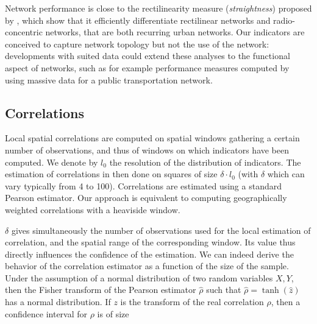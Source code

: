 \documentclass[11pt]{article}
\begin{document}
Network performance is close to the rectilinearity measure (\emph{straightness}) proposed by \cite{josselin2016straightness}, which show that it efficiently differentiate rectilinear networks and radio-concentric networks, that are both recurring urban networks. Our indicators are conceived to capture network topology but not the use of the network: developments with suited data could extend these analyses to the functional aspect of networks, such as for example performance measures computed by~\cite{trepanier2009calculation} using massive data for a public transportation network.



\subsection{Correlations}

Local spatial correlations are computed on spatial windows gathering a certain number of observations, and thus of windows on which indicators have been computed. We denote by $l_0$ the resolution of the distribution of indicators. The estimation of correlations in then done on squares of size $\delta\cdot l_0$ (with $\delta$ which can vary typically from 4 to 100). Correlations are estimated using a standard Pearson estimator. Our approach is equivalent to computing geographically weighted correlations \citep{brunsdon2002geographically} with a heaviside window.

$\delta$ gives simultaneously the number of observations used for the local estimation of correlation, and the spatial range of the corresponding window. Its value thus directly influences the confidence of the estimation. We can indeed derive the behavior of the correlation estimator as a function of the size of the sample. Under the assumption of a normal distribution of two random variables $X,Y$, then the Fisher transform of the Pearson estimator $\hat{\rho}$ such that $\hat{\rho} = \tanh (\hat{z})$ has a normal distribution. If $z$ is the transform of the real correlation $\rho$, then a confidence interval for $\rho$ is of size
\end{document}
